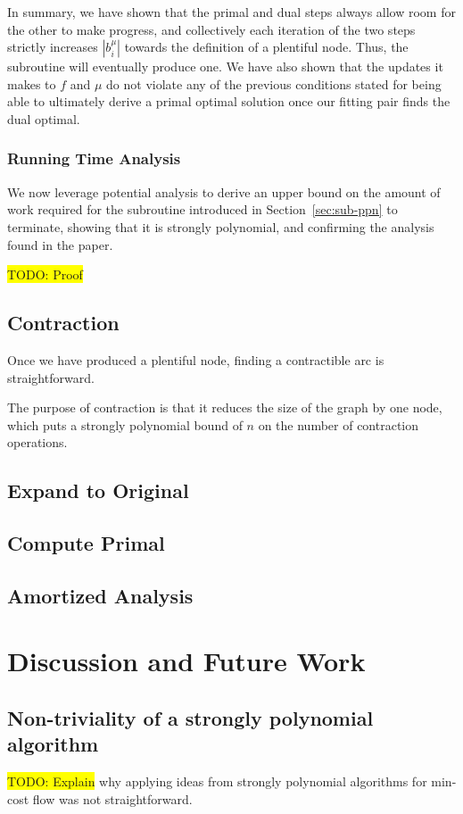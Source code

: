\documentclass[12pt]{article}
\theoremstyle{definition}
\newcommand{\biu}{b_{i}^{\mu}}
\newcommand{\todo}[1]{\colorbox{yellow}{TODO: #1}}
\begin{document}
In summary, we have shown that the primal and dual steps always allow room for the other to make progress, and collectively each iteration of the two steps strictly increases $|\biu|$ towards
the definition of a plentiful node. Thus, the subroutine will eventually produce one. We have also shown that the updates it makes to $f$ and $\mu$ do not violate any of the previous conditions stated for being able to ultimately derive a primal optimal solution once our fitting pair finds the dual optimal. 

\subsubsection{Running Time Analysis}

We now leverage potential analysis to derive an upper bound on the amount of work required for the subroutine introduced in Section~\ref{sec:sub-ppn} to terminate, showing that it is strongly polynomial, and confirming the analysis found in the paper. 

\todo{Proof}

\subsection{Contraction}

Once we have produced a plentiful node, finding a contractible arc is straightforward. 

The purpose of contraction is that it reduces the size of the graph by one node,
which puts a strongly polynomial bound of $n$ on the number of contraction
operations. 
\subsection{Expand to Original}
\subsection{Compute Primal}
\subsection{Amortized Analysis}





\section{Discussion and Future Work}

\subsection{Non-triviality of a strongly polynomial algorithm}

\todo{Explain} why applying ideas from strongly polynomial algorithms for
min-cost flow was not straightforward. 

\nocite{*}
\printbibliography
\end{document}
